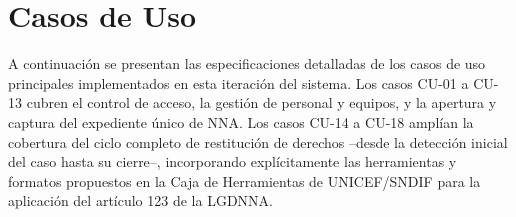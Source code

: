 \cleardoublepage
\section{Casos de Uso}

A continuación se presentan las especificaciones detalladas de los casos de uso principales implementados en esta iteración del sistema. Los casos CU-01 a CU-13 cubren el control de acceso, la gestión de personal y equipos, y la apertura y captura del expediente único de NNA. Los casos CU-14 a CU-18 amplían la cobertura del ciclo completo de restitución de derechos --desde la detección inicial del caso hasta su cierre--, incorporando explícitamente las herramientas y formatos propuestos en la Caja de Herramientas de UNICEF/SNDIF para la aplicación del artículo 123 de la LGDNNA.

























































